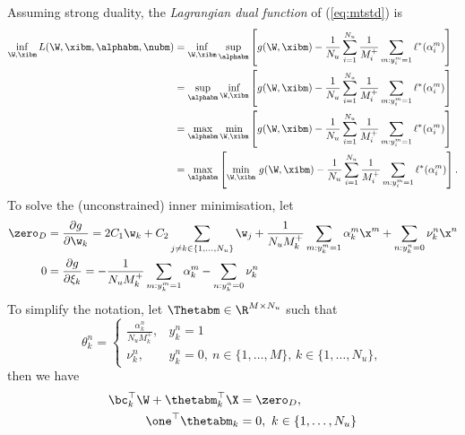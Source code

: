 Assuming strong duality, the \emph{Lagrangian dual function} of (\ref{eq:mtstd}) is
\begin{equation*}
\begin{aligned}
\inf_{\W, \xibm} L(\W, \xibm, \alphabm, \nubm)
&= \inf_{\W, \xibm} \sup_\alphabm \left[ g(\W, \xibm) - \frac{1}{N_u} \sum_{i = 1}^{N_u} \frac{1}{M_i^+} \sum_{m: y_i^m = 1} \ell^*(\alpha_i^m) \right] \\
&= \sup_\alphabm \inf_{\W, \xibm} \left[ g(\W, \xibm) - \frac{1}{N_u} \sum_{i = 1}^{N_u} \frac{1}{M_i^+} \sum_{m: y_i^m = 1} \ell^*(\alpha_i^m) \right] \\
&= \max_\alphabm \min_{\W, \xibm} \left[ g(\W, \xibm) - \frac{1}{N_u} \sum_{i = 1}^{N_u} \frac{1}{M_i^+} \sum_{m: y_i^m = 1} \ell^*(\alpha_i^m) \right] \\
&= \max_\alphabm \left[ \min_{\W, \xibm} \, g(\W, \xibm) 
                        - \frac{1}{N_u} \sum_{i = 1}^{N_u} \frac{1}{M_i^+} \sum_{m: y_i^m = 1} \ell^*(\alpha_i^m) \right].
\end{aligned}
\end{equation*}
To solve the (unconstrained) inner minimisation, let
\begin{equation*}
\begin{aligned}
\zero_D &= \frac{\partial g}{\partial \w_k} 
   = 2C_1 \w_k + C_2 \sum_{j\ne k \in \{1,\dots,N_u\}} \w_j 
     + \frac{1}{N_u M_k^+} \sum_{m: y_k^m = 1} \alpha_k^m \x^m
     + \sum_{n: y_k^n = 0} \nu_k^n \x^n \\
0 &= \frac{\partial g}{\partial \xi_k} 
   = -\frac{1}{N_u M_k^+} \sum_{m: y_k^m = 1} \alpha_k^m - \sum_{n: y_k^n = 0} \nu_k^n
\end{aligned}
\end{equation*}
To simplify the notation, let $\Thetabm \in \R^{M \times N_u}$ such that
\begin{equation*}
\theta_k^n = \begin{cases}
\frac{\alpha_k^n}{N_u M_k^+}, & y_k^n = 1 \\
\nu_k^n, & y_k^n = 0, \ n \in \{1,\dots,M\}, \, k \in \{1,\dots,N_u\},
\end{cases}
\end{equation*}
then we have
\begin{equation*}
\begin{aligned}
\bc_k^\top \W + \thetabm_k^\top \X &= \zero_D, \\
\one^\top \thetabm_k &= 0, \ k \in \{1,\dots,N_u\}
\end{aligned}
\end{equation*}
